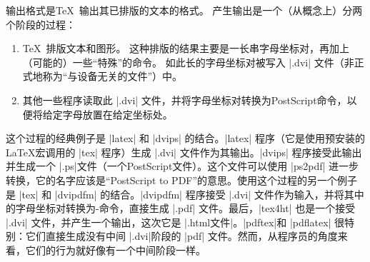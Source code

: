 输出格式是\TeX\ 输出其已排版的文本的格式。 产生输出是一个（从概念上）分两个阶段的过程：
%
\begin{enumerate}
    \item \TeX\ 排版文本和图形。 这种排版的结果主要是一长串字母坐标对，再加上（可能的）一些``特殊''的命令。 如此长的字母坐标对被写入 |.dvi| 文件（非正式地称为``与设备无关的文件''）中。
    \item 其他一些程序读取此 |.dvi| 文件，并将字母坐标对转换为PostScript命令，以便将给定字母放置在给定坐标处。
\end{enumerate}


这个过程的经典例子是 |latex| 和 |dvips| 的结合。|latex| 程序（它是使用预安装的\LaTeX 宏调用的 |tex| 程序）生成 |.dvi| 文件作为其输出。|dvips| 程序接受此输出并生成一个 |.ps|文件（一个PostScript文件）。这个文件可以使用 |ps2pdf| 进一步转换，它的名字应该是``PostScript to PDF''的意思。使用这个过程的另一个例子是 |tex| 和 |dvipdfm| 的结合。|dvipdfm| 程序接受 |.dvi| 文件作为输入，并将其中的字母坐标对转换为\pdf-命令，直接生成 |.pdf| 文件。最后，|tex4ht| 也是一个接受 |.dvi| 文件，并产生一个输出，这次它是 |.html文件|。|pdftex|和 |pdflatex| 很特别：它们直接生成没有中间 |.dvi|阶段的 |pdf| 文件。然而，从程序员的角度来看，它们的行为就好像有一个中间阶段一样。

